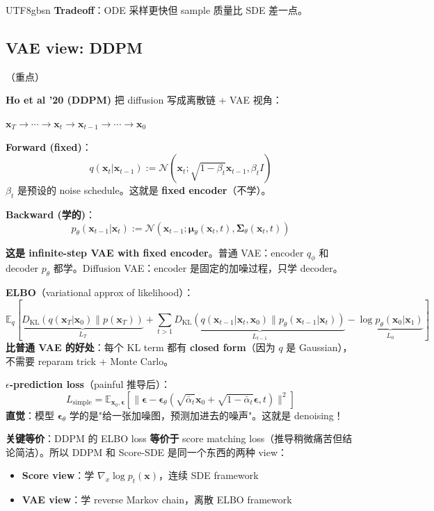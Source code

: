 \documentclass[11pt]{article}
\begin{document}
\begin{CJK}{UTF8}{gbsn}
\textbf{Tradeoff}：ODE 采样更快但 sample 质量比 SDE 差一点。

\subsection{VAE view: DDPM} （重点）

\textbf{Ho et al '20 (DDPM)} 把 diffusion 写成离散链 + VAE 视角：
\begin{center}
$\mathbf{x}_T \to \cdots \to \mathbf{x}_t \to \mathbf{x}_{t-1} \to \cdots \to \mathbf{x}_0$
\end{center}
\textbf{Forward (fixed)}：
\[
q(\mathbf{x}_t | \mathbf{x}_{t-1}) := \mathcal{N}(\mathbf{x}_t; \sqrt{1 - \beta_t} \mathbf{x}_{t-1}, \beta_t I)
\]
$\beta_t$ 是预设的 noise schedule。这就是 \textbf{fixed encoder}（不学）。

\textbf{Backward (学的)}：
\[
p_\theta(\mathbf{x}_{t-1} | \mathbf{x}_t) := \mathcal{N}(\mathbf{x}_{t-1}; \boldsymbol{\mu}_\theta(\mathbf{x}_t, t), \boldsymbol{\Sigma}_\theta(\mathbf{x}_t, t))
\]

\textbf{这是 infinite-step VAE with fixed encoder}。普通 VAE：encoder $q_\phi$ 和 decoder $p_\theta$ 都学。Diffusion VAE：encoder 是固定的加噪过程，只学 decoder。

\textbf{ELBO}（variational approx of likelihood）：
\[
\mathbb{E}_q \left[ \underbrace{D_{\text{KL}}(q(\mathbf{x}_T | \mathbf{x}_0) \| p(\mathbf{x}_T))}_{L_T} + \sum_{t > 1} \underbrace{D_{\text{KL}}(q(\mathbf{x}_{t-1} | \mathbf{x}_t, \mathbf{x}_0) \| p_\theta(\mathbf{x}_{t-1} | \mathbf{x}_t))}_{L_{t-1}} - \underbrace{\log p_\theta(\mathbf{x}_0 | \mathbf{x}_1)}_{L_0} \right]
\]
\textbf{比普通 VAE 的好处}：每个 KL term 都有 \textbf{closed form}（因为 $q$ 是 Gaussian），不需要 reparam trick + Monte Carlo。

\textbf{$\epsilon$-prediction loss}（painful 推导后）：
\[
L_{\text{simple}} = \mathbb{E}_{\mathbf{x}_0, \boldsymbol{\epsilon}} \left[ \| \boldsymbol{\epsilon} - \boldsymbol{\epsilon}_\theta(\sqrt{\bar{\alpha}_t} \mathbf{x}_0 + \sqrt{1 - \bar{\alpha}_t} \boldsymbol{\epsilon}, t) \|^2 \right]
\]
\textbf{直觉}：模型 $\boldsymbol{\epsilon}_\theta$ 学的是"给一张加噪图，预测加进去的噪声"。这就是 denoising！

\textbf{关键等价}：DDPM 的 ELBO loss \textbf{等价于} score matching loss（推导稍微痛苦但结论简洁）。所以 DDPM 和 Score-SDE 是同一个东西的两种 view：
\begin{itemize}[nosep]
  \item \textbf{Score view}：学 $\nabla_x \log p_t(\mathbf{x})$，连续 SDE framework
  \item \textbf{VAE view}：学 reverse Markov chain，离散 ELBO framework
\end{itemize}


\end{CJK}
\end{document}
